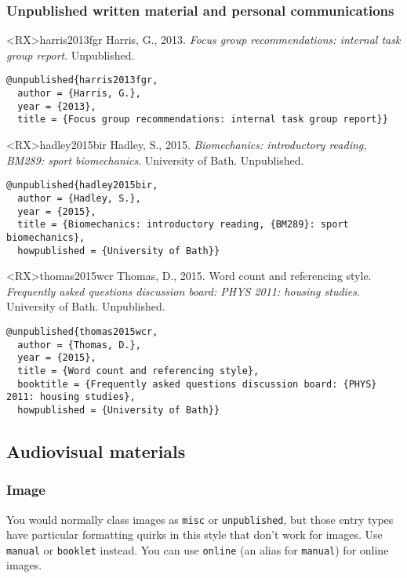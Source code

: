 \documentclass[10pt,a4paper]{article}
\newenvironment{tips}{%
  \begin{list}{\makebox[2em][c]{\faLightbulbO}}{%
    \setlength{\leftmargin}{2em}
    \setlength{\labelwidth}{2em}
    \setlength{\labelsep}{0pt}}
}{\end{list}}
\begin{document}
\subsubsection*{Unpublished written material and personal communications}

\begin{bibexbox}<RX>{harris2013fgr}
  Harris, G., 2013. \emph{Focus group recommendations: internal task group
  report}. Unpublished.
  \tcblower
\begin{Verbatim}
@unpublished{harris2013fgr,
  author = {Harris, G.},
  year = {2013},
  title = {Focus group recommendations: internal task group report}}
\end{Verbatim}
\end{bibexbox}

\begin{bibexbox}<RX>{hadley2015bir}
  Hadley, S., 2015. \emph{Biomechanics: introductory reading, BM289: sport
  biomechanics}. University of Bath. Unpublished.
  \tcblower
\begin{Verbatim}
@unpublished{hadley2015bir,
  author = {Hadley, S.},
  year = {2015},
  title = {Biomechanics: introductory reading, {BM289}: sport biomechanics},
  howpublished = {University of Bath}}
\end{Verbatim}
\end{bibexbox}

\begin{bibexbox}<RX>{thomas2015wcr}
  Thomas, D., 2015. Word count and referencing style. \emph{Frequently
  asked questions discussion board: PHYS 2011: housing studies}.
  University of Bath. Unpublished.
  \tcblower
\begin{Verbatim}
@unpublished{thomas2015wcr,
  author = {Thomas, D.},
  year = {2015},
  title = {Word count and referencing style},
  booktitle = {Frequently asked questions discussion board: {PHYS} 2011: housing studies},
  howpublished = {University of Bath}}
\end{Verbatim}
\end{bibexbox}

\subsection{Audiovisual materials}

\subsubsection*{Image}

\begin{tips}\item You would normally class images as \texttt{misc} or \texttt{unpublished}, but those entry types have particular formatting quirks in this style that don't work for images. Use \texttt{manual} or \texttt{booklet} instead. You can use \texttt{online} (an alias for \texttt{manual}) for online images.\end{tips}
\end{document}

